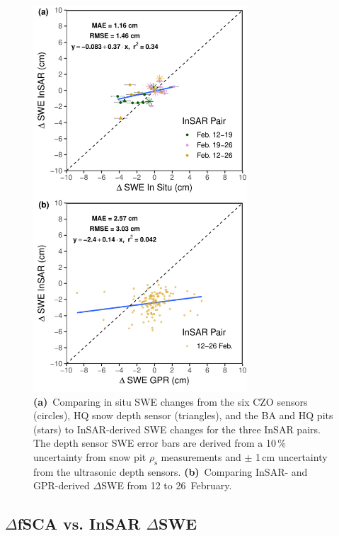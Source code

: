 \begin{figure}[t*]
\centering
\includegraphics[width=8cm]{figures/ch3_figs/fig11.pdf}
\caption{\textbf{(a)}~Comparing in situ SWE changes from the six CZO sensors (circles), HQ snow depth sensor (triangles), and the BA and HQ pits (stars) to InSAR-derived SWE changes for the three InSAR pairs. The depth sensor SWE error bars are derived from a 10\,\% uncertainty from snow pit $\rho_\mathrm{s}$ measurements and $\pm$ 1\,cm uncertainty from the ultrasonic depth sensors. \textbf{(b)}~Comparing InSAR- and GPR-derived $\Delta$SWE from 12 to 26~February.}
\end{figure}

\hypertarget{ch3-results-3}{\subsection{$\Delta$fSCA vs. InSAR $\Delta$SWE}\label{ch3-results-3}}


